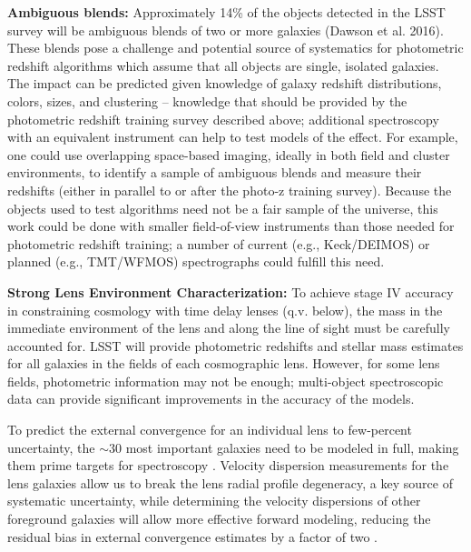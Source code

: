 {\bf Ambiguous blends:}
Approximately 14\% of the objects detected in the LSST survey will be ambiguous blends of two or more galaxies (Dawson et al. 2016). These  blends pose a challenge and potential source of systematics for photometric redshift algorithms which assume that all objects are single, isolated galaxies.
The impact can be predicted given knowledge of galaxy redshift distributions, colors, sizes, and clustering -- knowledge that should be provided by the photometric redshift training survey described above; additional spectroscopy with an equivalent instrument can help to test models of the effect.  For example, one could use overlapping space-based imaging, ideally in both field and cluster environments, to identify a sample of ambiguous blends and measure their redshifts (either in parallel to or after the photo-z training survey).  Because the objects used to test algorithms need not be a fair sample of the universe, this work could be done with smaller field-of-view instruments than those needed for photometric redshift training; a number of current (e.g., Keck/DEIMOS) or planned (e.g., TMT/WFMOS) spectrographs could fulfill this need.



{\bf Strong Lens Environment Characterization:}
To achieve stage IV accuracy in constraining cosmology with time delay lenses (q.v. below), the
mass in the immediate environment of the lens and along the line of
sight must be carefully accounted for. LSST will provide photometric
redshifts and stellar mass estimates for all galaxies in the fields of each
cosmographic lens.  
However, for some lens fields,
photometric information may not be enough; multi-object spectroscopic
data can provide significant improvements in the accuracy of the models.

To predict the external convergence for an individual lens to few-percent uncertainty, the $\sim 30$ most important galaxies need to be modeled in full, making
them prime targets for spectroscopy \cite{McCullyEtal2016}.  Velocity
dispersion measurements for the lens galaxies allow us to break the lens radial profile degeneracy, a 
key source of systematic uncertainty, while determining the velocity
dispersions of other foreground galaxies will allow more
effective forward modeling, reducing the residual bias in
external convergence estimates by a factor of two
\cite{CollettEtal2013}.  



